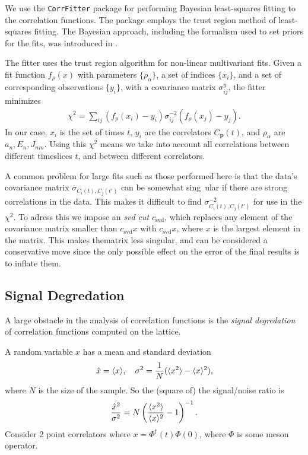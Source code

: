 We use the \texttt{CorrFitter} package \cite{CorrFitter} for performing Bayesian least-squares fitting to the correlation functions. The package employs the trust region method of least-squares fitting. The Bayesian approach, including the formalism used to set priors for the fits, was introduced in \cite{Lepage:2001ym}.

The fitter uses the trust region algorithm for non-linear multivariant fits. Given a fit function $f_{\rho}(x)$ with parameters $\{\rho_{\alpha}\}$, a set of indices $\{x_i\}$, and a set of corresponding observations $\{y_i\}$, with a covariance matrix $\sigma^y_{ij}$, the fitter minimizes
\begin{align}
  \chi^2 = \sum_{ij} ( f_{\rho}(x_i) - y_i ) \sigma_{ij}^{-2} ( f_{\rho}(x_j) - y_j ).
\end{align}
In our case, $x_i$ is the set of times $t$, $y_i$ are the correlators $C_{\textbf{p}}(t)$, and $\rho_{\alpha}$ are $a_n,E_n,J_{nm}$. Using this $\chi^2$ means we take into account all correlations between different timeslices $t$, and between different correlators.

A common problem for large fits such as those performed here is that the data’s covariance  matrix $\sigma_{C_i(t),C_j(t')}$ can be somewhat sing\
ular if there are strong correlations in the data. This makes it difficult to find $\sigma^{-2}_{C_i(t),C_j(t')}$ for use in the $\chi^2$. To adress this we impose an {\it{svd cut}} $c_{\text{svd}}$, which replaces any element of the covariance matrix smaller than $c_{\text{svd}} x$ with $c_{\text{svd}}x$, where $x$ is the largest element in the matrix. This makes thematrix less singular, and can be considered a conservative move since the only possible effect on the error of the final results is to inflate them.

\subsection{Signal Degredation}
\label{sec:signaldegredation}

A large obstacle in the analysis of correlation functions is the \textit{signal degredation} of correlation functions computed on the lattice.

A random variable $x$ has a mean and standard deviation
\begin{align}
  \hat{x} = \langle x \rangle,\quad
  \sigma^2 = {1\over N} ( \langle x^2 \rangle - \langle x \rangle^2 ),
\end{align}
where $N$ is the size of the sample. So the (square of) the signal/noise ratio is
\begin{align}
  {\hat{x}^2\over \sigma^2} = N \left( {\langle x^2 \rangle \over \langle x \rangle^2} - 1 \right) ^{-1}.
  \label{eq:signal-noise}
\end{align}
Consider 2 point correlators where $x = \Phi^{\dagger}(t) \Phi(0)$, where $\Phi$ is some meson operator.

